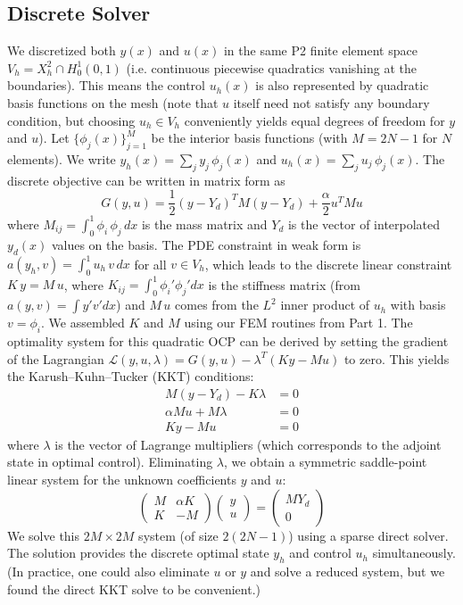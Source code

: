 \documentclass{article}
\begin{document}
\subsection{Discrete Solver}
We discretized both $y(x)$ and $u(x)$ in the same P2 finite element space $V_h = X_h^2 \cap H_0^1(0,1)$ (i.e. continuous piecewise quadratics vanishing at the boundaries). This means the control $u_h(x)$ is also represented by quadratic basis functions on the mesh (note that $u$ itself need not satisfy any boundary condition, but choosing $u_h\in V_h$ conveniently yields equal degrees of freedom for $y$ and $u$). Let $\{ \phi_j(x)\}_{j=1}^{M}$ be the interior basis functions (with $M=2N-1$ for $N$ elements). We write $y_h(x)=\sum_{j} y_j\,\phi_j(x)$ and $u_h(x)=\sum_{j} u_j\,\phi_j(x)$. The discrete objective can be written in matrix form as 
\begin{equation}
G(y,u) = \frac{1}{2}(y - Y_d)^T M (y - Y_d) + \frac{\alpha}{2}u^T M u
\end{equation}
where $M_{ij}=\int_0^1 \phi_i\,\phi_j\,dx$ is the mass matrix and $Y_d$ is the vector of interpolated $y_d(x)$ values on the basis. The PDE constraint in weak form is $a(y_h,v) = \int_0^1 u_h\,v\,dx$ for all $v\in V_h$, which leads to the discrete linear constraint $K\,y = M\,u$, where $K_{ij}=\int_0^1 \phi_i'\phi_j' dx$ is the stiffness matrix (from $a(y,v)=\int y'v' dx$) and $M\,u$ comes from the $L^2$ inner product of $u_h$ with basis $v=\phi_i$. We assembled $K$ and $M$ using our FEM routines from Part 1. The optimality system for this quadratic OCP can be derived by setting the gradient of the Lagrangian $\mathcal{L}(y,u,\lambda) = G(y,u) - \lambda^T(Ky - Mu)$ to zero. This yields the Karush–Kuhn–Tucker (KKT) conditions:
\begin{align*}
M(y - Y_d) - K\lambda &= 0 \\
\alpha M u + M \lambda &= 0 \\
K y - M u &= 0
\end{align*}
where $\lambda$ is the vector of Lagrange multipliers (which corresponds to the adjoint state in optimal control). Eliminating $\lambda$, we obtain a symmetric saddle-point linear system for the unknown coefficients $y$ and $u$:
\begin{equation}
\begin{pmatrix} M & \alpha K \\[6pt] K & -M \end{pmatrix} 
\begin{pmatrix} y \\[3pt] u \end{pmatrix} = 
\begin{pmatrix} MY_d \\[3pt] 0 \end{pmatrix}
\end{equation}
We solve this $2M \times 2M$ system (of size $2(2N-1)$) using a sparse direct solver. The solution provides the discrete optimal state $y_h$ and control $u_h$ simultaneously. (In practice, one could also eliminate $u$ or $y$ and solve a reduced system, but we found the direct KKT solve to be convenient.)
\end{document}
